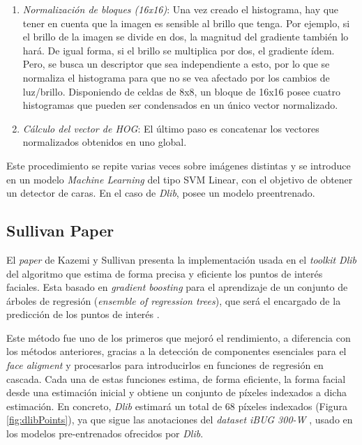 \begin{enumerate}
	\item \textit{Normalización de bloques (16x16)}: Una vez creado el histograma, hay que tener en cuenta que la imagen es sensible al brillo que tenga. Por ejemplo, si el brillo de la imagen se divide en dos, la magnitud del gradiente también lo hará. De igual forma, si el brillo se multiplica por dos, el gradiente ídem. Pero, se busca un descriptor que sea independiente a esto, por lo que se normaliza el histograma para que no se vea afectado por los cambios de luz/brillo.	Disponiendo de celdas de 8x8, un bloque de 16x16 posee cuatro histogramas que pueden ser condensados en un único vector normalizado.
	
	\item \textit{Cálculo del vector de HOG}: El último paso es concatenar los vectores normalizados obtenidos en uno global.

\end{enumerate}

Este procedimiento se repite varias veces sobre imágenes distintas y se introduce en un modelo \textit{Machine Learning} del tipo SVM Linear, con el objetivo de obtener un detector de caras. En el caso de \textit{Dlib}, posee un modelo preentrenado.

\vspace{-0.7cm}
\subsection*{Sullivan Paper}
\vspace{-0.5cm}
El \textit{paper} de Kazemi y Sullivan presenta la implementación usada en el \textit{toolkit Dlib} del algoritmo que estima de forma precisa y eficiente los puntos de interés faciales. Esta basado en \textit{gradient boosting} para el aprendizaje de un conjunto de árboles de regresión (\textit{ensemble of regression trees}), que será el encargado de la predicción de los puntos de interés \cite{faceLandmark}.

Este método fue uno de los primeros que mejoró el rendimiento, a diferencia con los métodos anteriores, gracias a la detección de componentes esenciales para el \textit{face aligment} y procesarlos para introducirlos en funciones de regresión en cascada. Cada una de estas funciones estima, de forma eficiente, la forma facial desde una estimación inicial y obtiene un conjunto de píxeles indexados a dicha estimación. En concreto, \textit{Dlib} estimará un total de 68 píxeles indexados (Figura \ref{fig:dlibPoints}), ya que sigue las anotaciones del \textit{dataset iBUG 300-W} \cite{ibug}, usado en los modelos pre-entrenados ofrecidos por \textit{Dlib}.

